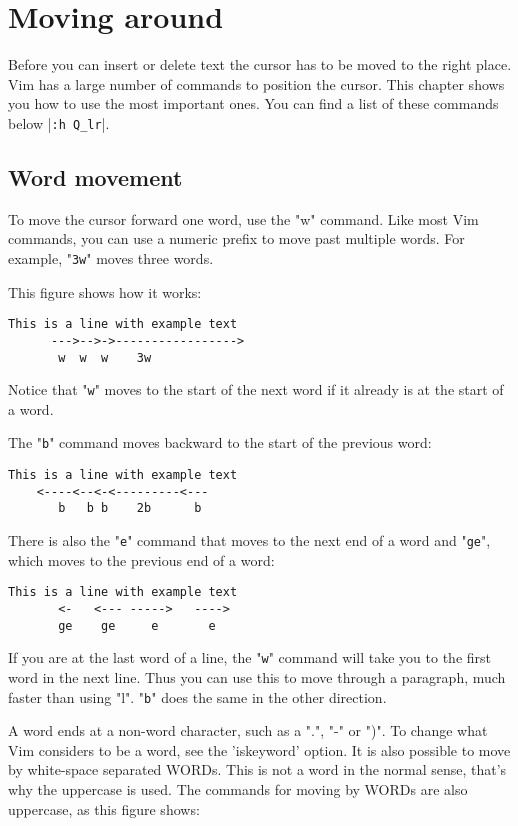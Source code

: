 \section{Moving around}
Before you can insert or delete text the cursor has to be moved to the right
place.  Vim has a large number of commands to position the cursor.  This
chapter shows you how to use the most important ones.  You can find a list of
these commands below |\verb!:h Q_lr!|.
\subsection{Word movement}

To move the cursor forward one word, use the "w" command.
Like most Vim commands, you can use a numeric prefix to move past multiple words.
For example, "\verb!3w!" moves three words.

This figure shows how it works:

		\begin{Verbatim}[samepage=true]
    This is a line with example text 
      --->-->->----------------->
       w  w  w    3w
		\end{Verbatim}

Notice that "\verb!w!" moves to the start of the next word if it already is at the start of a word.

The "\verb!b!" command moves backward to the start of the previous word:

		\begin{Verbatim}[samepage=true]
    This is a line with example text 
    <----<--<-<---------<---
       b   b b    2b      b
		\end{Verbatim}

There is also the "\verb!e!" command that moves to the next end of a word and "\verb!ge!", which moves to the previous end of a word:

		\begin{Verbatim}[samepage=true]
    This is a line with example text 
       <-   <--- ----->   ---->
       ge    ge     e       e
		\end{Verbatim}

If you are at the last word of a line, the "\verb!w!" command will take you to the first word in the next line.
Thus you can use this to move through a paragraph, much faster than using "l".
"\verb!b!" does the same in the other direction.

A word ends at a non-word character, such as a ".", "-" or ")".
To change what Vim considers to be a word, see the 'iskeyword' option.
It is also possible to move by white-space separated WORDs.
This is not a word in the normal sense, that's why the uppercase is used.
The commands for moving by WORDs are also uppercase, as this figure shows:

